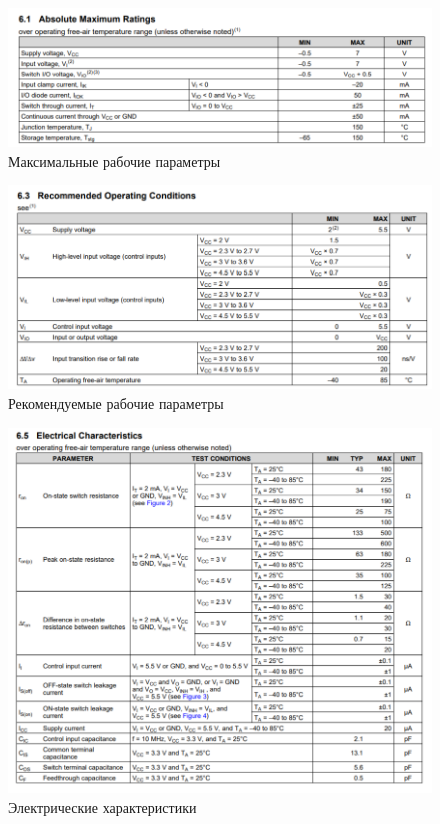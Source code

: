\begin{figure}[H]
	\centering
	\includegraphics[width=0.95\linewidth]{imgs/4/ti2}
	\caption{Максимальные рабочие параметры}
	\label{fig:4_ti2}
\end{figure}

\begin{figure}[H]
	\centering
	\includegraphics[width=0.95\linewidth]{imgs/4/ti3}
	\caption{Рекомендуемые рабочие параметры}
	\label{fig:4_ti3}
\end{figure}

\begin{figure}[H]
	\centering
	\includegraphics[width=0.95\linewidth]{imgs/4/ti4}
	\caption{Электрические характеристики}
	\label{fig:4_ti4}
\end{figure}